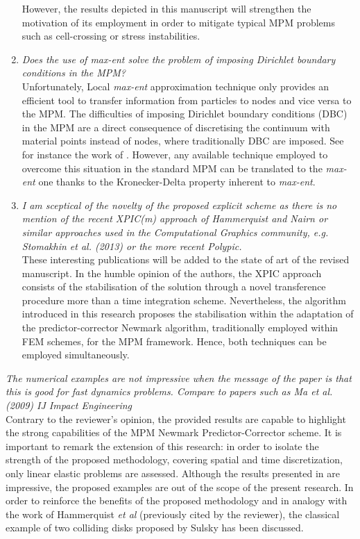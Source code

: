 \documentclass[12pt]{article}
\begin{document}
\begin{enumerate}
However, the results depicted in this manuscript will strengthen the motivation of its employment in order to mitigate typical MPM problems such as cell-crossing or stress instabilities.  

\item \textit{Does the use of max-ent solve the problem of imposing Dirichlet boundary conditions in the MPM?}\\

Unfortunately, Local \textit{max-ent} approximation technique only provides an efficient tool to transfer information from particles to nodes and vice versa to the MPM. The difficulties of imposing Dirichlet boundary conditions (DBC) in the MPM are a direct consequence of discretising the continuum with material points instead of nodes, where traditionally DBC are imposed. See for instance the work of \cite{Cortis_et_al_2017_IJNME}. However, any available technique employed to overcome this situation in the standard MPM can be translated to the \textit{max-ent} one thanks to the Kronecker-Delta property inherent to \textit{max-ent}.

\item \textit{I am sceptical of the novelty of the proposed explicit scheme as there is no mention of the recent XPIC(m) approach of Hammerquist and Nairn or similar approaches used in the Computational Graphics community, e.g. Stomakhin et al. (2013) or the more recent Polypic.}\\

These interesting publications will be added to the state of art of the revised manuscript. In the humble opinion of the authors, the XPIC approach consists of the stabilisation of the solution through a novel transference procedure more than a time integration scheme. Nevertheless, the algorithm introduced in this research proposes the stabilisation within the adaptation of the predictor-corrector Newmark algorithm, traditionally employed within FEM schemes, for the MPM framework. Hence, both techniques can be employed simultaneously.

\end{enumerate}

 \textit{The numerical examples are not impressive when the message of the paper is that this is good for fast dynamics problems. Compare to papers such as Ma et al. (2009) IJ Impact Engineering}\\

Contrary to the reviewer's opinion, the provided results are capable to highlight the strong capabilities of the MPM Newmark Predictor-Corrector scheme. It is important to remark the extension of this research: in order to isolate the strength of the proposed methodology, covering spatial and time discretization, only linear elastic problems are assessed. Although the results presented in \cite{MA2009272} are impressive, the proposed examples are out of the scope of the present research. In order to reinforce the benefits of the proposed methodology and in analogy with the work of Hammerquist \textit{et al} \cite{HAMMERQUIST2017724} (previously cited by the reviewer), the classical example of two colliding disks proposed by Sulsky has been discussed. 
\end{document}
